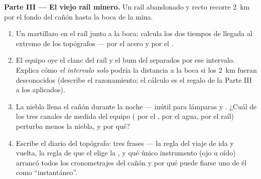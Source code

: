 \begin{problem}
\medskip\noindent\textbf{Parte III --- El viejo raíl minero.}
Un raíl abandonado y recto recorre \qty{2}{km} por el fondo del cañón
hasta la boca de la mina.
\begin{enumerate}[resume]
  \item Un martillazo en el raíl junto a la boca: calcula los dos
        tiempos de llegada al extremo de los topógrafos --- por el
        acero y por el .
  \item El equipo oye el clanc del raíl y el bum del  separados
        por ese intervalo. Explica cómo \emph{el intervalo solo}
        podría  la distancia a la boca si los \qty{2}{km}
        fueran desconocidos (describe el razonamiento; el cálculo es
        el regalo de la Parte III a los aplicados).
  \item La niebla llena el cañón durante la noche --- inútil para
        lámparas y . ¿Cuál de los tres canales de medida del
        equipo ( por el ,  por el agua,
         por el raíl) perturba menos la niebla, y por qué?
  \item Escribe el diario del topógrafo: tres frases --- la regla
        del viaje de ida y vuelta, la regla de que el  elige la
        , y qué único instrumento (ojo u oído) arrancó
        todos los cronometrajes del cañón y por qué puede fiarse uno
        de él como ``instantáneo''.
\end{enumerate}
\end{problem}
